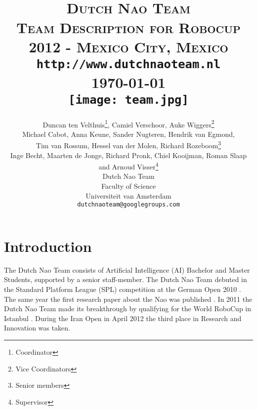 \documentclass[11pt]{article}
\title{
\HRule{0.5pt} \\
\LARGE \textbf{\textsc{Dutch Nao Team}}\\[0.5cm]
\normalsize \textsc{Team Description for Robocup 2012 - Mexico City, Mexico}\\
\texttt{http://www.dutchnaoteam.nl}
\normalsize
\HRule{2pt}\\ [0.5cm]
\normalsize
\today\\ [0.5cm]
\texttt{[image: team.jpg]}
}
\author{
{\small Duncan ten Velthuis\footnote{Coordinator}, Camiel Verschoor, Auke Wiggers\footnote{Vice Coordinators} \\
Michael Cabot, Anna Keune, Sander Nugteren, Hendrik van Egmond, \\
Tim van Rossum, Hessel van der Molen, Richard Rozeboom\footnote{Senior members} \\
Inge Becht, Maarten de Jonge, Richard Pronk,
Chiel Kooijman, Roman Slaap \\
and Arnoud Visser\footnote{Supervisor}}\\ [0.2cm]
Dutch Nao Team\\
Faculty of Science\\
Universiteit van Amsterdam\\
\texttt{dutchnaoteam@googlegroups.com} \\
}
\makeatletter
\def\printtitle{
    {\centering \@title\par}}
\def\printauthor{
    {\centering \large \@author}}
\makeatother
\begin{document}
\thispagestyle{empty}

\printtitle									
\vfill
\printauthor
\newpage
\setcounter{page}{1}
\normalsize
\section{Introduction}
The Dutch Nao Team consists of Artificial Intelligence (AI) Bachelor and Master Students, supported by a senior staff-member.
The Dutch Nao Team debuted in the Standard Platform League (SPL) competition at the German Open 2010 \cite{DutchNaoTeamTDP2010}. The same year the first research paper about the Nao was published \cite{vanDerMey2011}. 
In 2011 the Dutch Nao Team made its breakthrough by qualifying for the World RoboCup in Istanbul \cite{DutchNaoTeamTDP2011}. During the Iran Open in April 2012 the third place in Research and Innovation was taken.
\end{document}
